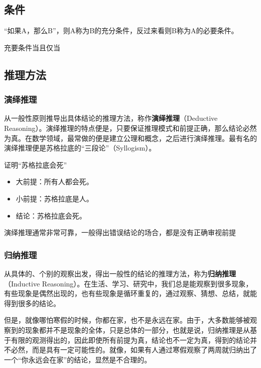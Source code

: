 \subsection{条件}



“如果A，那么B”，则A称为B的充分条件，反过来看则B称为A的必要条件。

充要条件当且仅当

\subsection{推理方法}

\subsubsection{演绎推理}

从一般性原则推导出具体结论的推理方法，称作\textbf{演绎推理}（Deductive Reasoning）。演绎推理的特点便是，只要保证推理模式和前提正确，那么结论必然为真。在数学领域，最常做的便是建立公理和概念，之后进行演绎推理。最有名的演绎推理便是苏格拉底的“三段论”（Syllogism）。

\begin{example}{证明“苏格拉底会死”}
\begin{itemize}
\item 大前提：所有人都会死。
\item 小前提：苏格拉底是人。
\item 结论：苏格拉底会死。
\end{itemize}
\end{example}

演绎推理通常非常可靠，一般得出错误结论的场合，都是没有正确审视前提

\subsubsection{归纳推理}

从具体的、个别的观察出发，得出一般性的结论的推理方法，称为\textbf{归纳推理}（Inductive Reasoning）。在生活、学习、研究中，我们总是能观察到很多现象，有些现象是偶然出现的，也有些现象是循环重复的，通过观察、猜想、总结，就能得到很多的结论。

但是，就像哪怕寒假的时候，你都在家，也不是永远在家。由于，大多数能够被观察到的现象都并不是现象的全体，只是总体的一部分，也就是说，归纳推理是从基于有限的观测得出的，因此即使所有前提为真，结论也不一定为真，得到的结论并不必然，而是具有一定可能性的。就像，如果有人通过寒假观察了两周就归纳出了一个“你永远会在家”的结论，显然是不合理的。

